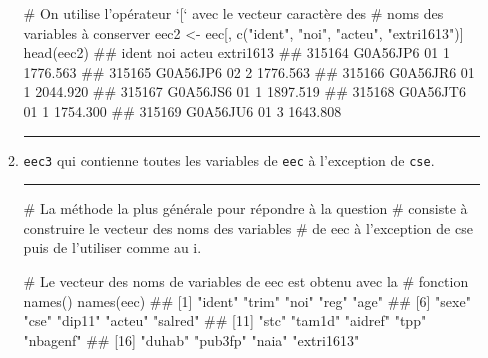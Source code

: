 \documentclass[12pt,twosided, notitlepage]{book}
\newenvironment{Shaded}{}{}
\newcommand{\CommentTok}[1]{\textcolor[rgb]{0.00,0.50,0.00}{#1}}
\newcommand{\KeywordTok}[1]{\textcolor[rgb]{0.00,0.00,1.00}{#1}}
\newcommand{\NormalTok}[1]{#1}
\newcommand{\StringTok}[1]{\textcolor[rgb]{0.00,0.50,0.50}{#1}}
\newif \ifsol
\renewenvironment{Shaded}{\begin{snugshade}}{\end{snugshade}}
\begin{document}
\begin{enumerate}
\begin{enumerate}
\begin{Shaded}
\begin{Highlighting}[]
\CommentTok{# On utilise l'opérateur `[` avec le vecteur caractère des}
\CommentTok{# noms des variables à conserver}
\NormalTok{eec2 <-}\StringTok{ }\NormalTok{eec[, }\KeywordTok{c}\NormalTok{(}\StringTok{"ident"}\NormalTok{, }\StringTok{"noi"}\NormalTok{, }\StringTok{"acteu"}\NormalTok{, }\StringTok{"extri1613"}\NormalTok{)]}
\KeywordTok{head}\NormalTok{(eec2)}
\NormalTok{  ##           ident noi acteu extri1613}
\NormalTok{  ## 315164 G0A56JP6  01     1  1776.563}
\NormalTok{  ## 315165 G0A56JP6  02     2  1776.563}
\NormalTok{  ## 315166 G0A56JR6  01     1  2044.920}
\NormalTok{  ## 315167 G0A56JS6  01     1  1897.519}
\NormalTok{  ## 315168 G0A56JT6  01     1  1754.300}
\NormalTok{  ## 315169 G0A56JU6  01     3  1643.808}
\end{Highlighting}
\end{Shaded}

    \begin{center} \rule{0.5\linewidth}{\linethickness}\end{center} 
      \bigskip 
      \fi
  \item
    \texttt{eec3} qui contienne toutes les variables de \texttt{eec} à
    l'exception de \texttt{cse}.

    \ifsol

    \textbf{Indication} Comment utiliseriez-vous les opérations
    ensemblistes sur les vecteurs (\emph{cf.} module 2) pour créer le
    vecteur des noms des variables de la table \texttt{eec} SAUF
    \texttt{cse} ? Utilisez-le comme au i. pour sélectionner toutes les
    variables sauf \texttt{cse}.\fi 

    \ifsol 
     \begin{center} \rule{0.5\linewidth}{\linethickness}\end{center}

\begin{Shaded}
\begin{Highlighting}[]
\CommentTok{# La méthode la plus générale pour répondre à la question}
\CommentTok{# consiste à construire le vecteur des noms des variables}
\CommentTok{# de eec à l'exception de cse puis de l'utiliser comme au i. }

\CommentTok{# Le vecteur des noms de variables de eec est obtenu avec la}
\CommentTok{# fonction names()}
\KeywordTok{names}\NormalTok{(eec)}
\NormalTok{  ##  [1] "ident"     "trim"      "noi"       "reg"       "age"      }
\NormalTok{  ##  [6] "sexe"      "cse"       "dip11"     "acteu"     "salred"   }
\NormalTok{  ## [11] "stc"       "tam1d"     "aidref"    "tpp"       "nbagenf"  }
\NormalTok{  ## [16] "duhab"     "pub3fp"    "naia"      "extri1613"}


\end{Highlighting}
\end{Shaded}
\end{enumerate}
\end{enumerate}
\end{document}
